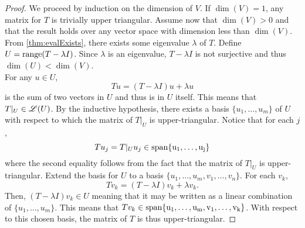 \documentclass[../../AlgebraQualSolutions.tex]{subfiles}
\begin{document}
\begin{proof}
    We proceed by induction on the dimension of $V$. If $\dim(V) = 1$, any matrix for $T$ is trivially upper triangular. Assume now that $\dim(V) > 0$ and that the result holds over any vector space with dimension less than $\dim(V)$. From \ref{thm:evalExists}, there exists some eigenvalue $\lambda$ of $T$. Define $U = \mathrm{range}(T - \lambda I)$. Since $\lambda$ is an eigenvalue, $T - \lambda I$ is not surjective and thus $\dim(U) < \dim(V)$.\\

    For any $u \in U$,
        \[Tu = (T - \lambda I)u + \lambda u\]
    is the sum of two vectors in $U$ and thus is in $U$ itself. This means that $T|_U \in \mathscr{L}(U)$. By the inductive hypothesis, there exists a basis $\{u_1,\ldots,u_m\}$ of $U$ with respect to which the matrix of $T|_U$ is upper-triangular. Notice that for each $j$,
        \[Tu_j = T|_Uu_j \in \rm{span}\{u_1,\ldots,u_j\}\]
    where the second equality follows from the fact that the matrix of $T|_U$ is upper-triangular. Extend the basis for $U$ to a basis $\{u_1,\ldots,u_m,v_1,\ldots,v_n\}$. For each $v_k$,
        \[Tv_k = (T -\lambda I)v_k + \lambda v_k.\]
    Then, $(T -\lambda I)v_k \in U$ meaning that it may be written as a linear combination of $\{u_1,\ldots, u_m\}$. This means that $Tv_k \in \rm{span}\{u_1,\ldots,u_m,v_1,\ldots, v_k\}$. With respect to this chosen basis, the  matrix of $T$ is thus upper-triangular.
\end{proof}
\end{document}
